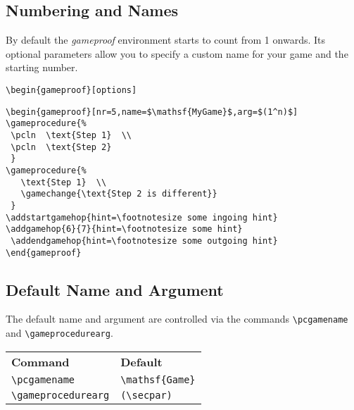 \documentclass[a4paper]{report}
\begin{document}
\subsection{Numbering and Names}
By default the \emph{gameproof} environment starts to count from 1 onwards. Its optional parameters allow you to specify a custom
name for your game and the starting number.
\begin{lstlisting}
\begin{gameproof}[options]
\end{lstlisting}

\begin{center}
\begin{gameproof}[nr=5,name=\mathsf{MyGame},arg=(1^n)]
\end{gameproof}
\end{center}

\begin{lstlisting}
\begin{gameproof}[nr=5,name=$\mathsf{MyGame}$,arg=$(1^n)$]
\gameprocedure{%
 \pcln  \text{Step 1}  \\
 \pcln  \text{Step 2}  
 }
\gameprocedure{%
   \text{Step 1}  \\
   \gamechange{\text{Step 2 is different}}  
 }
\addstartgamehop{hint=\footnotesize some ingoing hint}
\addgamehop{6}{7}{hint=\footnotesize some hint}
 \addendgamehop{hint=\footnotesize some outgoing hint}
\end{gameproof}
\end{lstlisting}


\subsection{Default Name and Argument}
The default name and argument are controlled via the commands \lstinline$\pcgamename$ and \lstinline$\gameprocedurearg$.

\begin{center}
\begin{tabular}{ll}
\textbf{Command} & \textbf{Default} \\
\lstinline$\pcgamename$ & \lstinline$\mathsf{Game}$ \\
\lstinline$\gameprocedurearg$ & \lstinline$(\secpar)$
\end{tabular}
\end{center}
\end{document}
